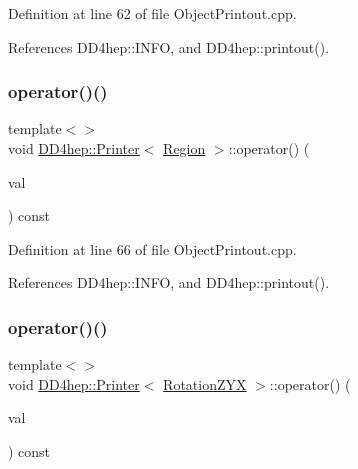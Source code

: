 Definition at line 62 of file Object\+Printout.\+cpp.



References D\+D4hep\+::\+I\+N\+FO, and D\+D4hep\+::printout().

\hypertarget{struct_d_d4hep_1_1_printer_aae536ffe33e3c2e7b51985dbd93e8226}{}\label{struct_d_d4hep_1_1_printer_aae536ffe33e3c2e7b51985dbd93e8226} 
\subsubsection{\texorpdfstring{operator()()}{operator()()}\hspace{0.1cm}{\footnotesize\ttfamily [7/12]}}
{\footnotesize\ttfamily template$<$$>$ \\
void \hyperlink{struct_d_d4hep_1_1_printer}{D\+D4hep\+::\+Printer}$<$ \hyperlink{class_d_d4hep_1_1_geometry_1_1_region}{Region} $>$\+::operator() (\begin{DoxyParamCaption}\item[{const \hyperlink{class_d_d4hep_1_1_geometry_1_1_region}{Region} \&}]{val }\end{DoxyParamCaption}) const}



Definition at line 66 of file Object\+Printout.\+cpp.



References D\+D4hep\+::\+I\+N\+FO, and D\+D4hep\+::printout().

\hypertarget{struct_d_d4hep_1_1_printer_a4a0c3d28367b9d06e9117ba1261e8bf1}{}\label{struct_d_d4hep_1_1_printer_a4a0c3d28367b9d06e9117ba1261e8bf1} 
\subsubsection{\texorpdfstring{operator()()}{operator()()}\hspace{0.1cm}{\footnotesize\ttfamily [8/12]}}
{\footnotesize\ttfamily template$<$$>$ \\
void \hyperlink{struct_d_d4hep_1_1_printer}{D\+D4hep\+::\+Printer}$<$ \hyperlink{namespace_d_d4hep_1_1_geometry_a24667b2b9c3cec3d5239828db4d52189}{Rotation\+Z\+YX} $>$\+::operator() (\begin{DoxyParamCaption}\item[{const \hyperlink{namespace_d_d4hep_1_1_geometry_a24667b2b9c3cec3d5239828db4d52189}{Rotation\+Z\+YX} \&}]{val }\end{DoxyParamCaption}) const}



